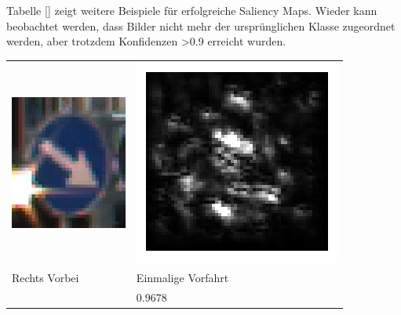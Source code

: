 Tabelle [] zeigt weitere Beispiele für erfolgreiche Saliency Maps. Wieder kann beobachtet werden, dass Bilder nicht mehr der ursprünglichen Klasse zugeordnet werden, aber trotzdem Konfidenzen >0.9 erreicht wurden. 



\begin{tabular}{p{4.4cm}p{4.4cm}}
	\includegraphics[height=4.4cm]{Images/AnPe/11240} &\includegraphics[width=\linewidth]{Images/AnPe/11240_guided}  \\
	Rechts Vorbei & Einmalige Vorfahrt\\
	& 0.9678\\

\end{tabular}
